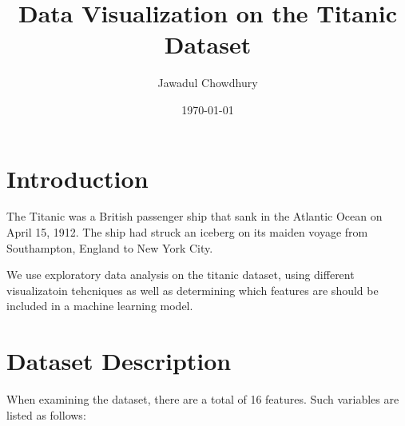 \documentclass[a4paper, twocolumn]{article}
\begin{document}
\title{Data Visualization on the Titanic Dataset}
\author{Jawadul Chowdhury}
\date{\today}
\maketitle

\section{Introduction}
The Titanic was a British passenger ship that sank in the Atlantic Ocean on April 15, 1912. The ship had struck an 
iceberg on its maiden voyage from Southampton, England to New York City. 

We use exploratory data analysis on the titanic dataset, using different visualizatoin tehcniques as well as
determining which features are should be included in a machine learning model.

\section{Dataset Description}
When examining the dataset, there are a total of 16 features. Such variables are listed as follows:
\end{document}
